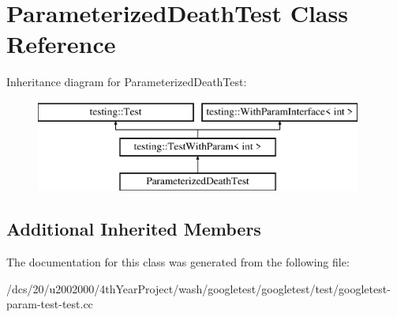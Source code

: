 \hypertarget{classParameterizedDeathTest}{}\section{Parameterized\+Death\+Test Class Reference}
\label{classParameterizedDeathTest}
Inheritance diagram for Parameterized\+Death\+Test\+:\begin{figure}[H]
\begin{center}
\leavevmode
\includegraphics[height=3.000000cm]{classParameterizedDeathTest}
\end{center}
\end{figure}
\subsection*{Additional Inherited Members}


The documentation for this class was generated from the following file\+:\begin{DoxyCompactItemize}
\item 
/dcs/20/u2002000/4th\+Year\+Project/wash/googletest/googletest/test/googletest-\/param-\/test-\/test.\+cc\end{DoxyCompactItemize}
